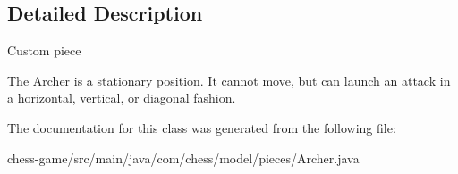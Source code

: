 \subsection{Detailed Description}
Custom piece

The \mbox{\hyperlink{classcom_1_1chess_1_1model_1_1pieces_1_1_archer}{Archer}} is a stationary position. It cannot move, but can launch an attack in a horizontal, vertical, or diagonal fashion. 

The documentation for this class was generated from the following file\+:\begin{DoxyCompactItemize}
\item 
chess-\/game/src/main/java/com/chess/model/pieces/Archer.\+java\end{DoxyCompactItemize}
